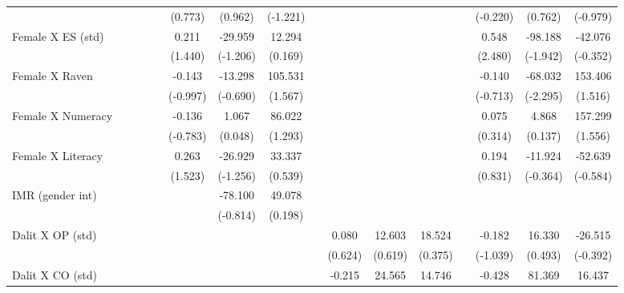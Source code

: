 {\begin{longtable}{@{\extracolsep{\fill}}lccccccccccccccc}
          &       &       &       &       & (0.773) & (0.962) & (-1.221) &       &       &       &       &       & (-0.220) & (0.762) & (-0.979) \\
    Female X ES (std) &       &       &       &       & 0.211 & -29.959 & 12.294 &       &       &       &       &       & 0.548 & -98.188 & -42.076 \\
          &       &       &       &       & (1.440) & (-1.206) & (0.169) &       &       &       &       &       & (2.480) & (-1.942) & (-0.352) \\
    Female X Raven &       &       &       &       & -0.143 & -13.298 & 105.531 &       &       &       &       &       & -0.140 & -68.032 & 153.406 \\
          &       &       &       &       & (-0.997) & (-0.690) & (1.567) &       &       &       &       &       & (-0.713) & (-2.295) & (1.516) \\
    Female X Numeracy &       &       &       &       & -0.136 & 1.067 & 86.022 &       &       &       &       &       & 0.075 & 4.868 & 157.299 \\
          &       &       &       &       & (-0.783) & (0.048) & (1.293) &       &       &       &       &       & (0.314) & (0.137) & (1.556) \\
    Female X Literacy &       &       &       &       & 0.263 & -26.929 & 33.337 &       &       &       &       &       & 0.194 & -11.924 & -52.639 \\
          &       &       &       &       & (1.523) & (-1.256) & (0.539) &       &       &       &       &       & (0.831) & (-0.364) & (-0.584) \\
    IMR (gender int) &       &       &       &       &       & -78.100 & 49.078 &       &       &       &       &       &       &       &  \\
          &       &       &       &       &       & (-0.814) & (0.198) &       &       &       &       &       &       &       &  \\
    Dalit X OP (std) &       &       &       &       &       &       &       &       & 0.080 & 12.603 & 18.524 &       & -0.182 & 16.330 & -26.515 \\
          &       &       &       &       &       &       &       &       & (0.624) & (0.619) & (0.375) &       & (-1.039) & (0.493) & (-0.392) \\
    Dalit X CO (std) &       &       &       &       &       &       &       &       & -0.215 & 24.565 & 14.746 &       & -0.428 & 81.369 & 16.437 \\

\end{longtable}}
